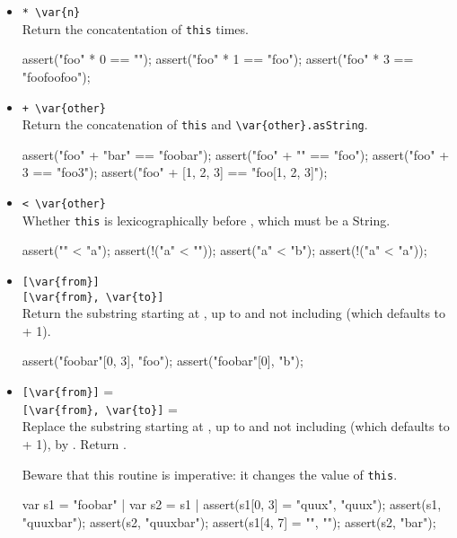\begin{itemize}
\item \lstinline|* \var{n}|\\
  Return the concatentation of \lstinline|this|  times.
\begin{urbiscript}[firstnumber=last]
assert("foo" * 0 == "");
assert("foo" * 1 == "foo");
assert("foo" * 3 == "foofoofoo");
\end{urbiscript}

\item \lstinline|+ \var{other}|\\
  Return the concatenation of \lstinline|this| and
  \lstinline|\var{other}.asString|.
\begin{urbiscript}[firstnumber=last]
assert("foo" + "bar" == "foobar");
assert("foo" + "" == "foo");
assert("foo" + 3 == "foo3");
assert("foo" + [1, 2, 3] == "foo[1, 2, 3]");
\end{urbiscript}

\item \lstinline|< \var{other}|\\
  Whether \lstinline|this| is lexicographically before ,
  which must be a String.
\begin{urbiscript}[firstnumber=last]
assert("" < "a");
assert(!("a" < ""));
assert("a" < "b");
assert(!("a" < "a"));
\end{urbiscript}

\item \lstinline|[\var{from}]|\\
  \lstinline|[\var{from}, \var{to}]|\\
  Return the substring starting at , up to and not including
   (which defaults to  + 1).
\begin{urbiscript}[firstnumber=last]
assert("foobar"[0, 3], "foo");
assert("foobar"[0], "b");
\end{urbiscript}

\item \lstinline|[\var{from}]| = \\
  \lstinline|[\var{from}, \var{to}]| = \\
  Replace the substring starting at , up to and not including
   (which defaults to  + 1), by .  Return
  .

  Beware that this routine is imperative: it changes the value of
  \lstinline|this|.
\begin{urbiscript}[firstnumber=last]
var s1 = "foobar" | var s2 = s1 |
assert(s1[0, 3] = "quux", "quux");
assert(s1, "quuxbar");
assert(s2, "quuxbar");
assert(s1[4, 7] = "", "");
assert(s2, "bar");
\end{urbiscript}
\end{itemize}

